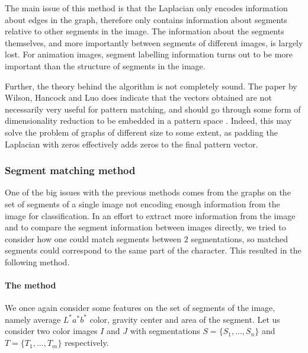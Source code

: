 The main issue of this method is that the Laplacian only encodes information about edges in the graph, therefore only contains information about segments relative to other segments in the image. The information about the segments themselves, and more importantly between segments of different images, is largely lost. For animation images, segment labelling information turns out to be more important than the structure of segments in the image.

Further, the theory behind the algorithm is not completely sound. The paper by Wilson, Hancock and Luo does indicate that the vectors obtained are not necessarily very useful for pattern matching, and should go through some form of dimensionality reduction to be embedded in a pattern space \cite{wilson2005pattern}. Indeed, this may solve the problem of graphs of different size to some extent, as padding the Laplacian with zeros effectively adds zeros to the final pattern vector.

\subsubsection{Segment matching method}
\label{sec:segmentMatching}

One of the big issues with the previous methods comes from the graphs on the set of segments of a single image not encoding enough information from the image for classification. In an effort to extract more information from the image and to compare the segment information between images directly, we tried to consider how one could match segments between $2$ segmentations, so matched segments could correspond to the same part of the character. This resulted in the following method.

\paragraph{The method} We once again consider some features on the set of segments of the image, namely average $L^*a^*b^*$ color, gravity center and area of the segment. Let us consider two color images $I$ and $J$ with segmentations $S = \{S_1, ..., S_n\}$ and $T = \{T_1, ..., T_m\}$ respectively.

